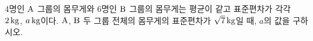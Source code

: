 4명인 $\mathrm{A}$ 그룹의 몸무게와 6명인 $\mathrm{B}$ 그룹의 몸무게는 평균이 같고 표준편차가 각각 $2\mkern3mu \mathrm{kg}$, $a\mkern3mu \mathrm{kg}$이다. $\mathrm{A}$, $\mathrm{B}$ 두 그룹 전체의 몸무게의 표준편차가 $\sqrt{7}\mkern3mu \mathrm{kg}$일 때, $a$의 값을 구하시오.

